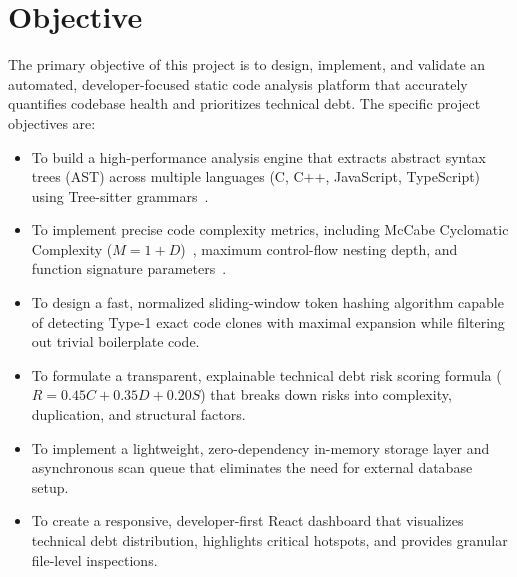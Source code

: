 \section{Objective}
The primary objective of this project is to design, implement, and validate an automated, developer-focused static code analysis platform that accurately quantifies codebase health and prioritizes technical debt. The specific project objectives are:
\begin{itemize}
    \item To build a high-performance analysis engine that extracts abstract syntax trees (AST) across multiple languages (C, C++, JavaScript, TypeScript) using Tree-sitter grammars~\cite{treesitter}.
    \item To implement precise code complexity metrics, including McCabe Cyclomatic Complexity ($M = 1 + D$)~\cite{mccabe1976}, maximum control-flow nesting depth, and function signature parameters~\cite{martin2008}.
    \item To design a fast, normalized sliding-window token hashing algorithm capable of detecting Type-1 exact code clones with maximal expansion while filtering out trivial boilerplate code.
    \item To formulate a transparent, explainable technical debt risk scoring formula ($R = 0.45C + 0.35D + 0.20S$) that breaks down risks into complexity, duplication, and structural factors.
    \item To implement a lightweight, zero-dependency in-memory storage layer and asynchronous scan queue that eliminates the need for external database setup.
    \item To create a responsive, developer-first React dashboard that visualizes technical debt distribution, highlights critical hotspots, and provides granular file-level inspections.
\end{itemize}

